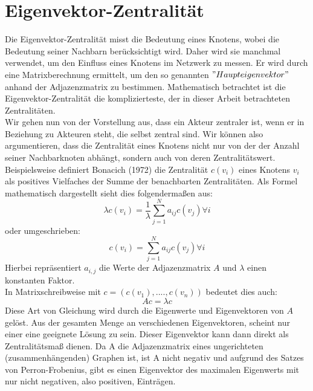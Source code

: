 \section{Eigenvektor-Zentralität}
Die Eigenvektor-Zentralität misst die Bedeutung eines Knotens, wobei die Bedeutung seiner Nachbarn berücksichtigt wird. Daher wird sie manchmal verwendet, um den Einfluss eines Knotens im Netzwerk zu messen. Er wird durch eine Matrixberechnung ermittelt, um den so genannten $"Haupteigenvektor"$ anhand der Adjazenzmatrix zu bestimmen. Mathematisch betrachtet ist die Eigenvektor-Zentralität die komplizierteste, der in dieser Arbeit betrachteten Zentralitäten.\\
Wir gehen nun von der Vorstellung aus, dass ein Akteur zentraler ist, wenn er in Beziehung zu Akteuren steht, die selbst zentral sind. Wir können also argumentieren, dass die Zentralität eines Knotens nicht nur von der der Anzahl seiner Nachbarknoten abhängt, sondern auch von deren Zentralitätswert. Beispielsweise definiert Bonacich (1972) die Zentralität $c(v_i)$ eines Knotens $v_i$ als positives Vielfaches der Summe der benachbarten Zentralitäten. Als Formel mathematisch dargestellt sieht dies folgendermaßen aus:
\begin{equation}
     \lambda c(v_i) = \frac{1}{\lambda} \sum_{j=1}^{N}a_{ij}c(v_j) \forall i
\end{equation} oder umgeschrieben:  
\begin{equation}
     c(v_i) = \sum_{j=1}^{N}a_{ij}c(v_j) \forall i
\end{equation}
Hierbei repräsentiert $a_{i,j}$ die Werte der Adjazenzmatrix $A$ und $\lambda$ einen konstanten Faktor. \\
In Matrixschreibweise mit $c = (c(v_1), ...., c(v_n))$ bedeutet dies auch:
\begin{equation}
     Ac = \lambda c
\end{equation}
Diese Art von Gleichung wird durch die Eigenwerte und Eigenvektoren von $A$ gelöst.
Aus der gesamten Menge an verschiedenen Eigenvektoren, scheint nur einer eine geeignete Lösung zu sein. 
Dieser Eigenvektor kann dann direkt als Zentralitätsmaß dienen. Da A die Adjazenzmatrix eines ungerichteten (zusammenhängenden) Graphen ist, ist A nicht negativ und aufgrund des Satzes von Perron-Frobenius, gibt es einen Eigenvektor des maximalen Eigenwerts mit nur nicht negativen, also positiven, Einträgen.


